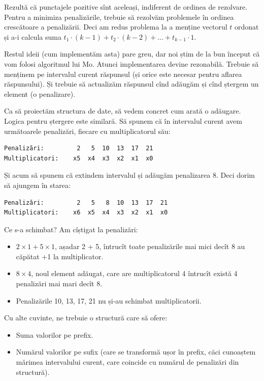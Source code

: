 Rezultă că punctajele pozitive sînt aceleași, indiferent de ordinea de rezolvare. Pentru a minimiza penalizările, trebuie să rezolvăm problemele în ordinea crescătoare a penalizării. Deci am redus problema la a menține vectorul $t$ ordonat și a-i calcula suma $t_1 \cdot (k-1) + t_2 \cdot (k-2) + \dots + t_{k-1} \cdot 1$.

Restul ideii (cum implementăm asta) pare greu, dar noi știm de la bun început că vom folosi algoritmul lui Mo. Atunci implementarea devine rezonabilă. Trebuie să menținem pe intervalul curent răspunsul (și orice este necesar pentru aflarea răspunsului). Și trebuie să actualizăm răspunsul cînd adăugăm și cînd ștergem un element (o penalizare).

Ca să proiectăm structura de date, să vedem concret cum arată o adăugare. Logica pentru ștergere este similară. Să spunem că în intervalul curent avem următoarele penalizări, fiecare cu multiplicatorul său:

\begin{verbatim}
Penalizări:         2   5  10  13  17  21
Multiplicatori:    x5  x4  x3  x2  x1  x0
\end{verbatim}

Și acum să spunem că extindem intervalul și adăugăm penalizarea 8. Deci dorim să ajungem în starea:

\begin{verbatim}
Penalizări:         2   5   8  10  13  17  21
Multiplicatori:    x6  x5  x4  x3  x2  x1  x0
\end{verbatim}

Ce s-a schimbat? Am cîștigat la penalizări:

\begin{itemize}
  \item $2 \times 1 + 5 \times 1$, așadar 2 + 5, întrucît toate penalizările mai mici decît 8 au căpătat +1 la multiplicator.

  \item $8 \times 4$, noul element adăugat, care are multiplicatorul 4 întrucît există 4 penalizări mai mari decît 8.

  \item Penalizările 10, 13, 17, 21 nu și-au schimbat multiplicatorii.
\end{itemize}

Cu alte cuvinte, ne trebuie o structură care să ofere:

\begin{itemize}
  \item Suma valorilor pe prefix.

  \item Numărul valorilor pe sufix (care se transformă ușor în prefix, căci cunoaștem mărimea intervalului curent, care coincide cu numărul de penalizări din structură).
\end{itemize}

